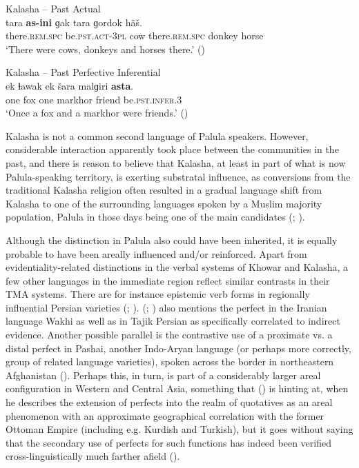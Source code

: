 \documentclass[output=paper]{langsci/langscibook}
\begin{document}
\begin{exe}
\ex Kalasha -- Past Actual \label{ex:hl22}\\
	\gll tara \textbf{as-ini} ɡak tara ɡordok hãš.\\
	there.\textsc{rem}.\textsc{spc} be.\textsc{pst}.\textsc{act}-3\textsc{pl} cow there.\textsc{rem}.\textsc{spc} donkey horse\\
	\trans ‘There were cows, donkeys and horses there.’  (\citealt[136]{Heegard2015}) 
\end{exe}

\begin{exe}
\ex Kalasha -- Past Perfective Inferential \label{ex:hl23}\\
	\gll ek ɬawak ek  šara malɡiri \textbf{asta}.\\
	one fox one markhor friend be.\textsc{pst}.\textsc{infer}.3\\
	\trans ‘Once a fox and a markhor were friends.’ (\citealt[182]{Heegard2015}) 
\end{exe}

Kalasha is not a common second language of Palula speakers. However, considerable interaction apparently took place between the communities in the past, and there is reason to believe that Kalasha, at least in part of what is now Palula-speaking territory, is exerting substratal influence, as conversions from the traditional Kalasha religion often resulted in a gradual language shift from Kalasha to one of the surrounding languages spoken by a Muslim majority population, Palula in those days being one of the main candidates (\citealt[117--118]{Cacopardo2001}; \citealt[55--60]{Decker1992}).

Although the distinction in Palula also could have been inherited, it is equally probable to have been areally influenced and/or reinforced. Apart from evidentiality-related distinctions in the verbal systems of Khowar and Kalasha, a few other languages in the immediate region reflect similar contrasts in their TMA systems. There are for instance epistemic verb forms in regionally influential Persian varieties (\citealt{Perry2000}; \citealt[461]{WindfuhrPerry2009}). \citeauthor{Bashir2010} (\citeyear[14–15]{Bashir2010}; \citeyear[839]{Bashir2009}) also mentions the perfect in the Iranian language Wakhi as well as in Tajik Persian as specifically correlated to indirect evidence. Another possible parallel is the contrastive use of a proximate vs. a distal perfect in Pashai, another Indo-Aryan language (or perhaps more correctly, group of related language varieties), spoken across the border in northeastern Afghanistan (\citealt[295--297]{Lehr2014}). Perhaps this, in turn, is part of a considerably larger areal configuration in Western and Central Asia, something that \citeauthor{Dahl1985} (\citeyear[152]{Dahl1985}) is hinting at, when he describes the extension of perfects into the realm of quotatives as an areal phenomenon with an approximate geographical correlation with the former Ottoman Empire (including e.g. Kurdish and Turkish), but it goes without saying that the secondary use of perfects for such functions has indeed been verified cross-linguistically much farther afield (\citealt[112]{Aikhenvald2004}).
\end{document}
